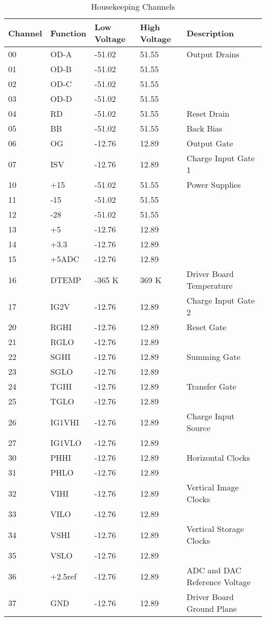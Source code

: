 \documentclass[a4paper,12pt]{article}
\begin{document}
\begin{table}[h]
\centering
\begin{tabular}{|l|l|l|l|l|}
\hline
Channel & Function & Low Voltage & High Voltage & Description\\
\hline
00 & OD-A & -51.02 & 51.55 & Output Drains \\
01 & OD-B & -51.02 & 51.55 &\\
02 & OD-C & -51.02 & 51.55& \\
03 & OD-D & -51.02 & 51.55& \\
\hline
04 & RD & -51.02 & 51.55 & Reset Drain\\
\hline
05 & BB & -51.02 & 51.55 & Back Bias \\
\hline
06 & OG &  -12.76 & 12.89& Output Gate \\
\hline
07 & ISV & -12.76 & 12.89& Charge Input Gate 1\\
\hline
10 & +15 & -51.02 & 51.55 & Power Supplies\\
11 & -15 & -51.02 & 51.55 & \\
12 & -28 & -51.02 & 51.55 &\\
13 & +5 & -12.76 & 12.89&\\
14 & +3.3&  -12.76 & 12.89&\\
15 & +5ADC & -12.76 & 12.89& \\
\hline
16 & DTEMP & -365 K & 369 K & Driver Board Temperature\\
\hline
17 & IG2V &  -12.76 & 12.89& Charge Input Gate 2 \\
\hline
20 & RGHI & -12.76 & 12.89& Reset Gate\\
21 & RGLO & -12.76 & 12.89& \\
\hline
22 & SGHI & -12.76 & 12.89& Summing Gate \\
23 & SGLO & -12.76 & 12.89& \\
\hline
24 & TGHI & -12.76 & 12.89& Transfer Gate\\
25 & TGLO & -12.76 & 12.89& \\
\hline
26 & IG1VHI & -12.76 & 12.89& Charge Input Source\\
27 & IG1VLO & -12.76 & 12.89& \\
\hline
30 & PHHI & -12.76 & 12.89& Horizontal Clocks\\
31 & PHLO & -12.76 & 12.89&\\
\hline
32 & VIHI & -12.76 & 12.89& Vertical Image Clocks\\
33 & VILO & -12.76 & 12.89&\\
\hline
34 & VSHI & -12.76 & 12.89& Vertical Storage Clocks\\
35 & VSLO & -12.76 & 12.89&\\
\hline
36 & +2.5ref & -12.76 & 12.89& ADC and DAC Reference Voltage\\
\hline
37 & GND & -12.76 & 12.89& Driver Board Ground Plane\\
\hline
\end{tabular}
\caption{Housekeeping Channels}
\label{HKC}
\end{table}
\end{document}
